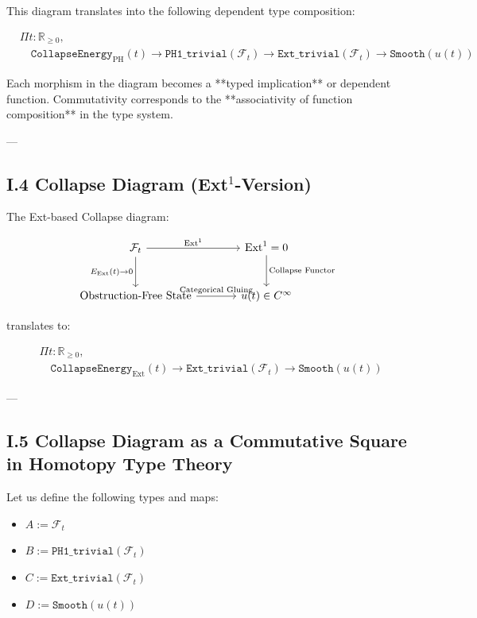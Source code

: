 \documentclass[11pt]{article}
\begin{document}
This diagram translates into the following dependent type composition:

\begin{align*}
& \Pi t : \mathbb{R}_{\ge 0}, \\
& \quad \texttt{CollapseEnergy}_{\mathrm{PH}}(t) \to
\texttt{PH1\_trivial}(\mathcal{F}_t) \to
\texttt{Ext\_trivial}(\mathcal{F}_t) \to
\texttt{Smooth}(u(t))
\end{align*}

Each morphism in the diagram becomes a **typed implication** or dependent function.  
Commutativity corresponds to the **associativity of function composition** in the type system.

---

\subsection*{I.4 Collapse Diagram (Ext$^1$-Version)}

The Ext-based Collapse diagram:

\[
\begin{tikzcd}[row sep=large, column sep=large]
\mathcal{F}_t
  \arrow[r, "{\mathrm{Ext}^1}"]
  \arrow[d, "{E_{\mathrm{Ext}}(t) \to 0}"']
& \mathrm{Ext}^1 = 0
  \arrow[d, "{\text{Collapse Functor}}"] \\
\text{Obstruction-Free State}
  \arrow[r, "{\text{Categorical Gluing}}"]
& u(t) \in C^\infty
\end{tikzcd}
\]

translates to:

\begin{align*}
& \Pi t : \mathbb{R}_{\ge 0}, \\
& \quad \texttt{CollapseEnergy}_{\mathrm{Ext}}(t) \to
\texttt{Ext\_trivial}(\mathcal{F}_t) \to
\texttt{Smooth}(u(t))
\end{align*}

---

\subsection*{I.5 Collapse Diagram as a Commutative Square in Homotopy Type Theory}

Let us define the following types and maps:

\begin{itemize}
  \item \( A := \mathcal{F}_t \)
  \item \( B := \texttt{PH1\_trivial}(\mathcal{F}_t) \)
  \item \( C := \texttt{Ext\_trivial}(\mathcal{F}_t) \)
  \item \( D := \texttt{Smooth}(u(t)) \)
\end{itemize}
\end{document}
